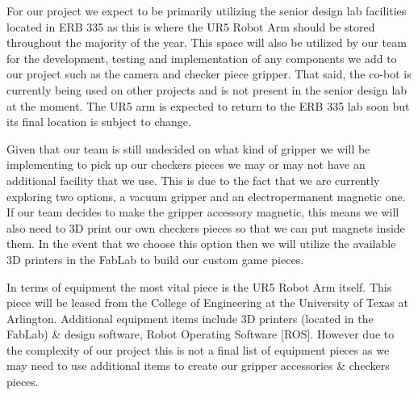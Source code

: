 
For our project we expect to be primarily utilizing the senior design lab facilities located in ERB 335 as this is where the UR5 Robot Arm should be stored throughout the majority of the year. This space will also be utilized by our team for the development, testing and implementation of any components we add to our project such as the camera and checker piece gripper. That said, the co-bot is currently being used on other projects and is not present in the senior design lab at the moment. The UR5 arm is expected to return to the ERB 335 lab soon but its final location is subject to change.

Given that our team is still undecided on what kind of gripper we will be implementing to pick up our checkers pieces we may or may not have an additional facility that we use. This is due to the fact that we are currently exploring two options, a vacuum gripper and an electropermanent magnetic one. If our team decides to make the gripper accessory magnetic, this means we will also need to 3D print our own checkers pieces so that we can put magnets inside them. In the event that we choose this option then we will utilize the available 3D printers in the FabLab to build our custom game pieces.

In terms of equipment the most vital piece is the UR5 Robot Arm itself. This piece will be leased from the College of Engineering at the University of Texas at Arlington. Additional equipment items include 3D printers (located in the FabLab) \& design software, Robot Operating Software [ROS]. However due to the complexity of our project this is not a final list of equipment pieces as we may need to use additional items to create our gripper accessories \& checkers pieces.
